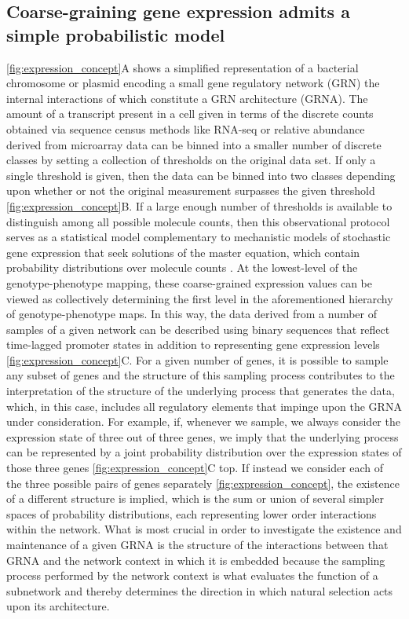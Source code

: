 \subsection{Coarse-graining gene expression admits a simple probabilistic model}
\ref{fig:expression_concept}A shows a simplified representation of a bacterial chromosome or plasmid encoding a small gene regulatory network (GRN) the internal interactions of which constitute a GRN architecture (GRNA). The amount of a transcript present in a cell given in terms of the discrete counts obtained via sequence census methods like RNA-seq or relative abundance derived from microarray data can be binned into a smaller number of discrete classes by setting a collection of thresholds on the original data set. If only a single threshold is given, then the data can be binned into two classes depending upon whether or not the original measurement surpasses the given threshold \ref{fig:expression_concept}B. If a large enough number of thresholds is available to distinguish among all possible molecule counts, then this observational protocol serves as a statistical model complementary to mechanistic models of stochastic gene expression that seek solutions of the master equation, which contain probability distributions over molecule counts \cite{Walczak2009,Mugler2009}. At the lowest-level of the genotype-phenotype mapping, these coarse-grained expression values can be viewed as collectively determining the first level in the aforementioned hierarchy of genotype-phenotype maps. In this way, the data derived from a number of samples of a given network can be described using binary sequences that reflect time-lagged promoter states in addition to representing gene expression levels \ref{fig:expression_concept}C. For a given number of genes, it is possible to sample any subset of genes and the structure of this sampling process contributes to the interpretation of the structure of the underlying process that generates the data, which, in this case, includes all regulatory elements that impinge upon the GRNA under consideration. For example, if, whenever we sample, we always consider the expression state of three out of three genes, we imply that the underlying process can be represented by a joint probability distribution over the expression states of those three genes \ref{fig:expression_concept}C top. If instead we consider each of the three possible pairs of genes separately \ref{fig:expression_concept}, the existence of a different structure is implied, which is the sum or union of several simpler spaces of probability distributions, each representing lower order interactions within the network. What is most crucial in order to investigate the existence and maintenance of a given GRNA is the structure of the interactions between that GRNA and the network context in which it is embedded because the sampling process performed by the network context is what evaluates the function of a subnetwork and thereby determines the direction in which natural selection acts upon its architecture.

